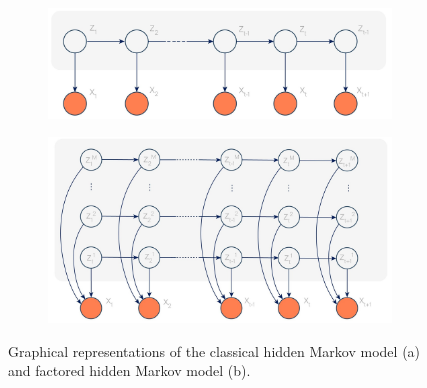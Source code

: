 \documentclass{article}
\begin{document}
\begin{figure}[t]
\centering
\begin{subfigure}{0.75\textwidth}
   \includegraphics[width=1\linewidth]{figures/hmm.jpg}
   \caption{}
   \label{fig:hmm} 
\end{subfigure}

\begin{subfigure}{1\textwidth}
   \includegraphics[width=1\linewidth]{figures/fhmm.jpg}
   \caption{}
   \label{fig:fhmm}
\end{subfigure}

\caption[Two numerical solutions]{Graphical representations of the classical hidden Markov model (a) and factored hidden Markov model (b).}
\end{figure}
\end{document}
